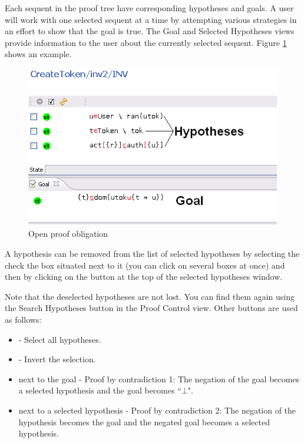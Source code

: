 Each sequent in the proof tree have corresponding hypotheses and goals. A user will work with one selected sequent at a time by attempting various strategies in an effort to show that the goal is true. The \textsf{Goal} and \textsf{Selected Hypotheses} views provide information to the user about the currently selected sequent. Figure \ref{fig_ref_01_proving_perspective3} shows an example.

\begin{figure}[!ht]
\begin{center}
	\includegraphics{img/reference/ref_01_proving_perspective3.png}
	\caption{Open proof obligation}
	\label{fig_ref_01_proving_perspective3}
\end{center}
\end{figure}

A hypothesis can be removed from the list of selected hypotheses by selecting the check the box situated next to it (you can click on several boxes at once) and then by clicking on the  button at the top of the selected hypotheses window.

Note that the deselected hypotheses are not lost. You can find them again using the \textsf{Search Hypotheses}  button in the Proof Control view. Other buttons are used as follows:

\begin{itemize}
	\item {} - Select all hypotheses. 
	\item {} - Invert the selection. 
	\item {} next to the goal - Proof by contradiction 1: The negation of the goal becomes a selected hypothesis and the goal becomes ``$\bot$". 
	\item {} next to a selected hypothesis - Proof by contradiction 2: The negation of the hypothesis becomes the goal and the negated goal becomes a selected hypothesis. 
\end{itemize}

